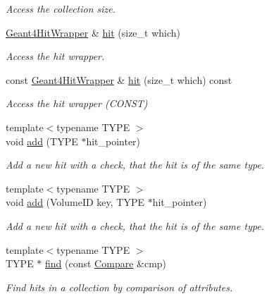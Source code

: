 \begin{DoxyCompactItemize}
\begin{DoxyCompactList}\small\item\em Access the collection size. \end{DoxyCompactList}\item 
\hyperlink{class_d_d4hep_1_1_simulation_1_1_geant4_hit_wrapper}{Geant4\+Hit\+Wrapper} \& \hyperlink{class_d_d4hep_1_1_simulation_1_1_geant4_hit_collection_a6d42d1abdf6f052cc6606f0c55d55388}{hit} (size\+\_\+t which)
\begin{DoxyCompactList}\small\item\em Access the hit wrapper. \end{DoxyCompactList}\item 
const \hyperlink{class_d_d4hep_1_1_simulation_1_1_geant4_hit_wrapper}{Geant4\+Hit\+Wrapper} \& \hyperlink{class_d_d4hep_1_1_simulation_1_1_geant4_hit_collection_adcca4533ecc91bd954bc2e4526d8fe77}{hit} (size\+\_\+t which) const
\begin{DoxyCompactList}\small\item\em Access the hit wrapper (C\+O\+N\+ST) \end{DoxyCompactList}\item 
{\footnotesize template$<$typename T\+Y\+PE $>$ }\\void \hyperlink{class_d_d4hep_1_1_simulation_1_1_geant4_hit_collection_aeb5ededae3913d70a3aeecfa8ba0b853}{add} (T\+Y\+PE $\ast$hit\+\_\+pointer)
\begin{DoxyCompactList}\small\item\em Add a new hit with a check, that the hit is of the same type. \end{DoxyCompactList}\item 
{\footnotesize template$<$typename T\+Y\+PE $>$ }\\void \hyperlink{class_d_d4hep_1_1_simulation_1_1_geant4_hit_collection_a7a7f4d771ab2266fe0b6869001af9e6d}{add} (Volume\+ID key, T\+Y\+PE $\ast$hit\+\_\+pointer)
\begin{DoxyCompactList}\small\item\em Add a new hit with a check, that the hit is of the same type. \end{DoxyCompactList}\item 
{\footnotesize template$<$typename T\+Y\+PE $>$ }\\T\+Y\+PE $\ast$ \hyperlink{class_d_d4hep_1_1_simulation_1_1_geant4_hit_collection_acf068dedd6941bee984bfd54fe17795f}{find} (const \hyperlink{class_d_d4hep_1_1_simulation_1_1_geant4_hit_collection_1_1_compare}{Compare} \&cmp)
\begin{DoxyCompactList}\small\item\em Find hits in a collection by comparison of attributes. \end{DoxyCompactList}\item 

\end{DoxyCompactItemize}
